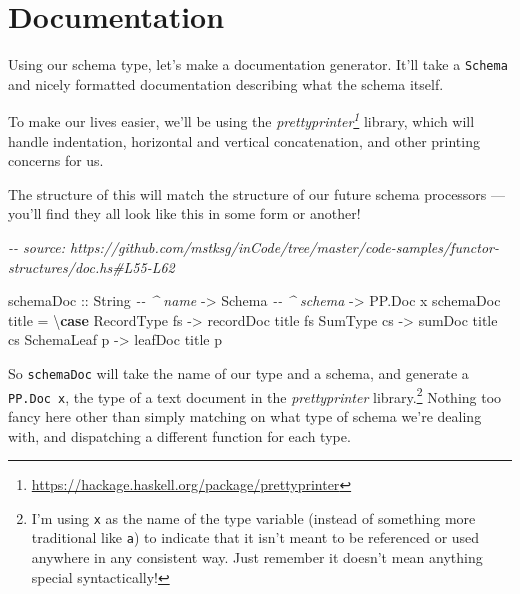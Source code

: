 \documentclass[]{article}
\newenvironment{Shaded}{}{}
\newcommand{\CommentTok}[1]{\textcolor[rgb]{0.38,0.63,0.69}{\textit{#1}}}
\newcommand{\DataTypeTok}[1]{\textcolor[rgb]{0.56,0.13,0.00}{#1}}
\newcommand{\KeywordTok}[1]{\textcolor[rgb]{0.00,0.44,0.13}{\textbf{#1}}}
\newcommand{\NormalTok}[1]{#1}
\newcommand{\OtherTok}[1]{\textcolor[rgb]{0.00,0.44,0.13}{#1}}
\renewcommand{\href}[2]{#2\footnote{\url{#1}}}
\begin{document}
\hypertarget{documentation}{%
\section{Documentation}\label{documentation}}

Using our schema type, let's make a documentation generator. It'll take a
\texttt{Schema} and nicely formatted documentation describing what the schema
itself.

To make our lives easier, we'll be using the
\emph{\href{https://hackage.haskell.org/package/prettyprinter}{prettyprinter}}
library, which will handle indentation, horizontal and vertical concatenation,
and other printing concerns for us.

The structure of this will match the structure of our future schema processors
--- you'll find they all look like this in some form or another!

\begin{Shaded}
\begin{Highlighting}[]
\CommentTok{{-}{-} source: https://github.com/mstksg/inCode/tree/master/code{-}samples/functor{-}structures/doc.hs\#L55{-}L62}

\NormalTok{schemaDoc}
\OtherTok{    ::} \DataTypeTok{String}       \CommentTok{{-}{-} \^{} name}
    \OtherTok{{-}>} \DataTypeTok{Schema}       \CommentTok{{-}{-} \^{} schema}
    \OtherTok{{-}>} \DataTypeTok{PP.Doc}\NormalTok{ x}
\NormalTok{schemaDoc title }\OtherTok{=}\NormalTok{ \textbackslash{}}\KeywordTok{case}
    \DataTypeTok{RecordType}\NormalTok{ fs }\OtherTok{{-}>}\NormalTok{ recordDoc title fs}
    \DataTypeTok{SumType}\NormalTok{ cs    }\OtherTok{{-}>}\NormalTok{ sumDoc title cs}
    \DataTypeTok{SchemaLeaf}\NormalTok{ p  }\OtherTok{{-}>}\NormalTok{ leafDoc title p}
\end{Highlighting}
\end{Shaded}

So \texttt{schemaDoc} will take the name of our type and a schema, and generate
a \texttt{PP.Doc\ x}, the type of a text document in the \emph{prettyprinter}
library.\footnote{I'm using \texttt{x} as the name of the type variable (instead
  of something more traditional like \texttt{a}) to indicate that it isn't meant
  to be referenced or used anywhere in any consistent way. Just remember it
  doesn't mean anything special syntactically!} Nothing too fancy here other
than simply matching on what type of schema we're dealing with, and dispatching
a different function for each type.
\end{document}
